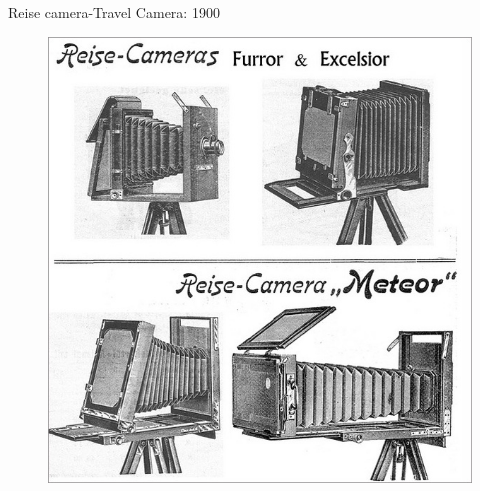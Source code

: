 \documentclass{beamer}
\begin{document}
	\begin{frame}{Reise camera-Travel Camera: 1900}
		\begin{figure}
			\centering
			\includegraphics[scale=0.3]{128.jpg}
		\end{figure}
	\end{frame}
\end{document}
